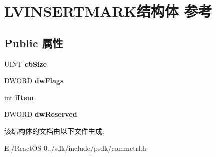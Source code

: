 \hypertarget{struct_l_v_i_n_s_e_r_t_m_a_r_k}{}\section{L\+V\+I\+N\+S\+E\+R\+T\+M\+A\+R\+K结构体 参考}
\label{struct_l_v_i_n_s_e_r_t_m_a_r_k}
\subsection*{Public 属性}
\begin{DoxyCompactItemize}
\item 
\mbox{\label{struct_l_v_i_n_s_e_r_t_m_a_r_k_a5ee4f41f1b6ab1f4e80db09a21502a4a}} 
U\+I\+NT {\bfseries cb\+Size}
\item 
\mbox{\label{struct_l_v_i_n_s_e_r_t_m_a_r_k_ad39d535ae97eb899223e401cddbfb80b}} 
D\+W\+O\+RD {\bfseries dw\+Flags}
\item 
\mbox{\label{struct_l_v_i_n_s_e_r_t_m_a_r_k_ab855f52cb8cfbb77fbb6eec8c2c547b7}} 
int {\bfseries i\+Item}
\item 
\mbox{\label{struct_l_v_i_n_s_e_r_t_m_a_r_k_a1f5198180e0c47007803d1c6581a6c61}} 
D\+W\+O\+RD {\bfseries dw\+Reserved}
\end{DoxyCompactItemize}


该结构体的文档由以下文件生成\+:\begin{DoxyCompactItemize}
\item 
E\+:/\+React\+O\+S-\/0../sdk/include/psdk/commctrl.\+h\end{DoxyCompactItemize}
